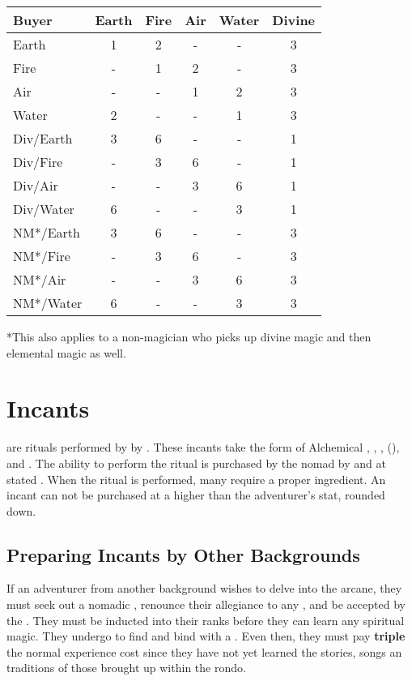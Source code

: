 \begin{multicols*}{2}
\begin{normbox}
\begin{tabular}{l c c c c c}
\small
\textbf{Buyer} & \textbf{Earth}  & \textbf{Fire} & \textbf{Air} & \textbf{Water}  & \textbf{Divine}\\
\midrule
Earth & 1 & 2 & - & - & 3\\
Fire & - & 1 & 2 & - & 3\\
Air & - & - & 1 & 2 & 3\\
Water & 2 & - & - & 1 & 3\\
Div/Earth & 3 & 6 & - & - & 1\\
Div/Fire & - & 3 & 6 & - & 1\\
Div/Air & - & - & 3 & 6 & 1\\
Div/Water & 6 & - & - & 3 & 1\\
NM*/Earth & 3 & 6 & - & - & 3\\
NM*/Fire & - & 3 & 6 & - & 3\\
NM*/Air & - & - & 3 & 6 & 3\\
NM*/Water & 6 & - & - & 3 & 3\\
\end{tabular}
\end{normbox}
\normalsize
*This also applies to a non-magician who picks up divine magic and then elemental magic as well.

\section{Incants}
 are rituals performed by by . These
incants take the form of Alchemical , , ,  (), and . The ability to perform the ritual is purchased by the nomad by  and at stated . When the ritual is performed, many require a proper ingredient. An incant can not be purchased at a  higher than  the adventurer's \PER stat, rounded down.
\subsection{Preparing Incants by Other Backgrounds}
If an adventurer from another background wishes to delve into the arcane, they must seek out a nomadic , renounce their allegiance to any , and be accepted by the . They must be inducted into their ranks before they can learn any spiritual magic. They undergo  to find and bind with a . Even then, they must pay \textbf{triple} the normal experience cost since they have not yet learned the stories, songs an traditions of those brought up within the rondo.
\vfill\null


\end{multicols*}
